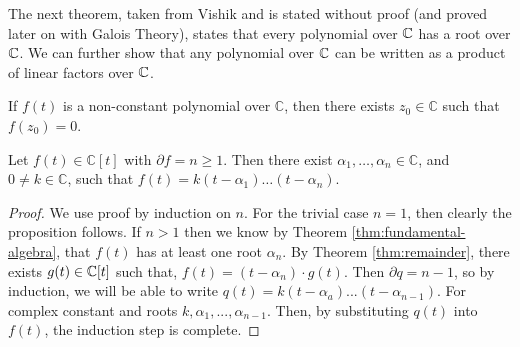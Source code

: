 The next theorem, taken from Vishik \cite{complex-functions-uon} and is stated without proof (and proved later on with Galois Theory), states that every polynomial over $\mathbb C$ has a root over $\mathbb C$. We can further show that any polynomial over $\mathbb C$ can be written as a product of linear factors over $\mathbb C$. 


\begin{theorem} \label{thm:fundamental-algebra}
    If $f(t)$ is a non-constant polynomial over $\mathbb{C}$, then there exists $z_0 \in \mathbb{C}$ such that $f\left(z_0\right)=0$.
\end{theorem}


\begin{theorem} \label{thm:fundamental-algebra-2}
	Let $f(t) \in \mathbb{C}[t]$ with $\partial f=n \geq 1$. Then there exist $\alpha_1, \ldots, \alpha_n \in \mathbb{C}$, and $0 \neq k \in \mathbb{C}$, such that
	$
	f(t)=k\left(t-\alpha_1\right) \ldots\left(t-\alpha_n\right).
	$
\end{theorem}

\begin{proof}
	We use proof by induction on $n$. For the trivial case $n = 1$, then clearly the proposition follows. If $n > 1$ then we know by Theorem \ref{thm:fundamental-algebra}, that $f(t)$ has at least one root $\alpha_n$. By Theorem \ref{thm:remainder}, there exists $g(t) \in \mathbb C[t]$ such that,
		$f(t) = (t-\alpha_n)\cdot g(t)$. 
	Then $\partial q = n - 1$, so by induction, we will be able to write
		$q(t) = k(t-\alpha_a)...(t-\alpha_{n-1})$. 
	For complex constant and roots $k,\alpha_1,...,\alpha_{n-1}$. Then, by substituting $q(t)$ into $f(t)$, the induction step is complete.
\end{proof}
